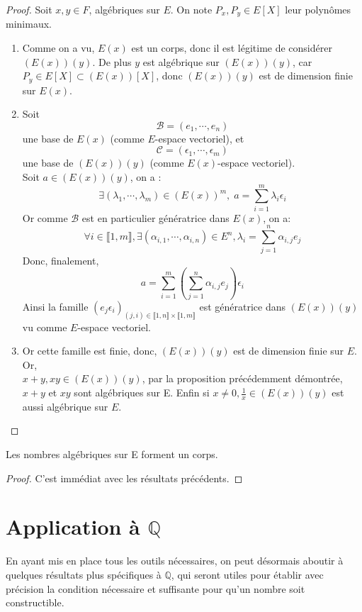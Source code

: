\documentclass[a4paper,12pt,french]{report}
\begin{document}
		\begin{proof}
			Soit \(x,y \in F\), algébriques sur $E$. On note \(P_{x},P_{y} \in E[X]\) leur polynômes minimaux.
			\begin{enumerate}
				\item
				    Comme on a vu, $E(x)$ est un corps, donc il est légitime de considérer $(E(x))(y)$.
				    De plus $y$ est algébrique sur $(E(x))(y)$, car \(P_{y} \in E[X] \subset (E(x))[X]\), donc $(E(x))(y)$ est de dimension finie sur $E(x)$.
				\item 
				    Soit \[\mathcal{B} = (e_{1}, \cdots, e_{n}) \] une base de $E(x)$ (comme $E$-espace vectoriel), et \[\mathcal{C} = (\epsilon_{1},\cdots, \epsilon_{m})\] une base de $(E(x))(y)$ (comme $E(x)$-espace vectoriel).\\
				    Soit \(a \in (E(x))(y) \), on a : \[\exists (\lambda_{1},\cdots,\lambda_{m}) \in (E(x))^{m}, \; a = \sum_{i=1}^{m}\lambda_{i}\epsilon_{i}\]
				    Or comme $\mathcal{B}$ est en particulier génératrice dans $E(x)$, on a:
				    \[\forall i \in \llbracket 1 , m \rrbracket, \exists (\alpha_{i,1},\cdots,\alpha_{i,n}) \in E^{n}, \lambda_{i} = \sum_{j=1}^{n}\alpha_{i,j}e_{j} \]
				    Donc, finalement, 
				    \[a = \sum_{i=1}^{m} \left(  \sum_{j=1}^{n}\alpha_{i,j}e_{j} \right)\epsilon_{i} \]
				    Ainsi la famille \((e_{j}\epsilon_{i})_{(j,i) \in \llbracket 1 , n \rrbracket \times \llbracket 1 , m \rrbracket} \) est génératrice dans $(E(x))(y)$ vu comme {$E$-espace vectoriel}.
				\item{}
				    Or cette famille est finie, donc, $(E(x))(y)$ est de dimension finie sur $E$.  Or, \\\({x+y,xy \in (E(x))(y)}\), par la proposition précédemment démontrée, $x+y$ et $xy$ sont algébriques sur E. Enfin si $x \neq 0, \frac{1}{x} \in (E(x))(y)$ est aussi algébrique sur $E$.
			\end{enumerate}
		\end{proof}
		
		
		\begin{proposition}
			Les nombres algébriques sur E forment un corps.
		\end{proposition}
		\begin{proof}
		    C'est immédiat avec les résultats précédents.
		\end{proof}
	
		\section{Application à $\mathbb{Q}$}
	En ayant mis en place tous les outils nécessaires, on peut désormais aboutir à quelques résultats plus spécifiques à $\mathbb{Q}$, qui seront utiles pour établir avec précision la condition nécessaire et suffisante pour qu'un nombre soit constructible.
		
\end{document}
